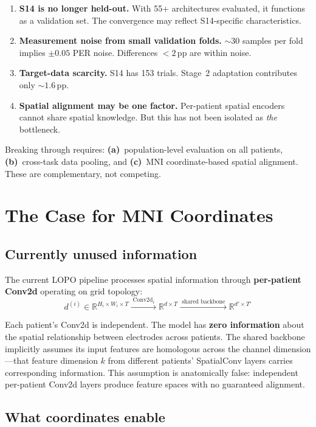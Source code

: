 \documentclass[11pt,letterpaper]{article}
\newcommand{\pp}{\,\text{pp}}
\newcommand{\R}{\mathbb{R}}
\begin{document}
\begin{enumerate}[leftmargin=2em]
\item \textbf{S14 is no longer held-out.} With 55+ architectures evaluated, it functions as a validation set. The convergence may reflect S14-specific characteristics.
\item \textbf{Measurement noise from small validation folds.} ${\sim}30$ samples per fold implies ${\pm}0.05$ PER noise. Differences ${<}2\pp$ are within noise.
\item \textbf{Target-data scarcity.} S14 has 153 trials. Stage~2 adaptation contributes only ${\sim}1.6\pp$.
\item \textbf{Spatial alignment may be one factor.} Per-patient spatial encoders cannot share spatial knowledge. But this has not been isolated as \emph{the} bottleneck.
\end{enumerate}

\noindent Breaking through requires: \textbf{(a)}~population-level evaluation on all patients, \textbf{(b)}~cross-task data pooling, and \textbf{(c)}~MNI coordinate-based spatial alignment. These are complementary, not competing.


\section{The Case for MNI Coordinates}

\subsection{Currently unused information}

The current LOPO pipeline processes spatial information through \textbf{per-patient Conv2d} operating on grid topology:
\[
d^{(i)} \in \R^{H_i \times W_i \times T}
\xrightarrow{\;\text{Conv2d}_i\;}
\R^{d \times T}
\xrightarrow{\;\text{shared backbone}\;}
\R^{d' \times T'}
\]

Each patient's Conv2d is independent. The model has \textbf{zero information} about the spatial relationship between electrodes across patients. The shared backbone implicitly assumes its input features are homologous across the channel dimension---that feature dimension $k$ from different patients' SpatialConv layers carries corresponding information. This assumption is anatomically false: independent per-patient Conv2d layers produce feature spaces with no guaranteed alignment.

\subsection{What coordinates enable}
\end{document}
